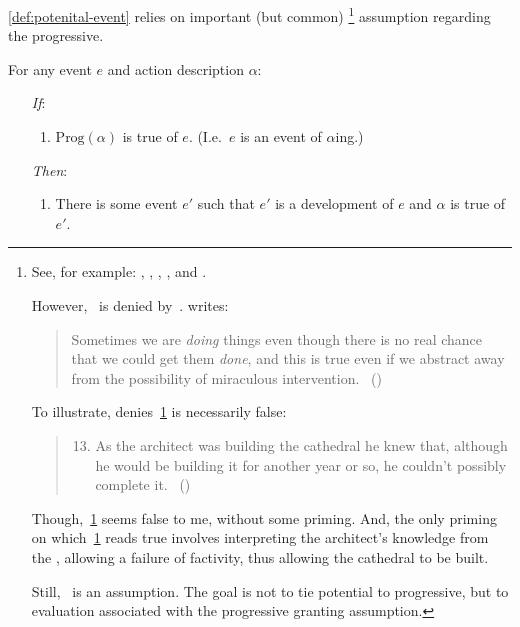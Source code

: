 \begin{note}
  \autoref{def:potenital-event} relies on important (but common)%
  \footnote{
    See, for example:
    \textcite{Bennett:1972uw},
    \textcite{Dowty:1979vq},
    \textcite{Parsons:1990aa},
    \textcite{Landman:1992wh}, and
    \textcite{Portner:1998um}.

    However,~ is denied by~\textcite{Szabo:2004ul}.
    \citeauthor{Szabo:2004ul} writes:
    \begin{quote}
      Sometimes we are \emph{doing} things even though there is no real chance that we could get them \emph{done}, and this is true even if we abstract away from the possibility of miraculous intervention.%
      \mbox{ }\hfill\mbox{(\citeyear[40]{Szabo:2004ul})}
    \end{quote}
    To illustrate, \citeauthor{Szabo:2004ul} denies~\ref{Szabo:Arch} is necessarily false:
    \begin{quote}
      \begin{enumerate}[label=(\arabic*), ref=(\arabic*)]
        \setcounter{enumi}{12}
      \item
        \label{Szabo:Arch}
        As the architect was building the cathedral he knew that, although he would be building it for another year or so, he couldn't possibly complete it.%
        \mbox{ }\hfill\mbox{(\citeyear[38]{Szabo:2004ul})}
      \end{enumerate}
    \end{quote}
    Though,~\ref{Szabo:Arch} seems false to me, without some priming.
    And, the only priming on which~\ref{Szabo:Arch} reads true involves interpreting the architect's knowledge from the , allowing a failure of factivity, thus allowing the cathedral to be built.

    Still,~ is an assumption.
    The goal is not to tie potential to progressive, but to evaluation associated with the progressive granting assumption.
  }
  assumption regarding the progressive.

  \begin{assumption}[\assuPP{2}]
    \label{assu:PP}
    For any event \(e\) and action description \(\alpha\):
    \begin{enumerate}
    \item[\emph{If}:]
      \begin{enumerate}[label=\alph*., ref=(\alph*)]
      \item
        \(\text{Prog}(\alpha)\) is true of \(e\).%
        \hfill(I.e.\ \(e\) is an event of \(\alpha\)ing.)
      \end{enumerate}
    \item[\emph{Then}:]
      \begin{enumerate}[label=\alph*., ref=(\alph*), resume]
      \item
        There is some  event \(e'\) such that \(e'\) is a development of \(e\) and \(\alpha\) is true of \(e'\).
      \end{enumerate}
    \end{enumerate}
    \vspace{-\baselineskip}
  \end{assumption}


\end{note}
